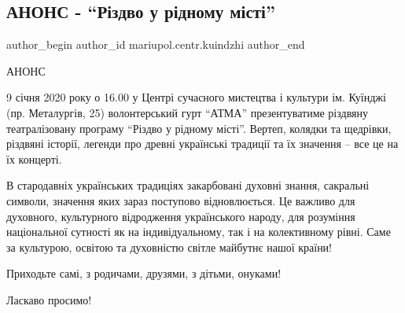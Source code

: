  
 
 
 
 

\subsection{АНОНС - \enquote{Різдво у рідному місті}}
\label{sec:27_12_2019.fb.mariupol.centr.kuindzhi.1.anons_rizdvo_u_ridnomu_misti}

\ifcmt
 author_begin
   author_id mariupol.centr.kuindzhi
 author_end
\fi

АНОНС

9 січня 2020 року о 16.00 у Центрі сучасного мистецтва і культури ім. Куїнджі
(пр. Металургів, 25)  волонтерський гурт \enquote{АТМА} презентуватиме різдвяну
театралізовану програму \enquote{Різдво у рідному місті}. Вертеп, колядки та
щедрівки, різдвяні історії, легенди про древні українські традиції та їх
значення – все це на їх концерті.

В стародавніх українських традиціях закарбовані духовні знання, сакральні
символи, значення яких зараз поступово відновлюється. Це важливо для духовного,
культурного відродження українського народу, для розуміння національної
сутності як на індивідуальному, так і на колективному рівні. Саме за культурою,
освітою та духовністю світле майбутнє нашої країни!

Приходьте самі, з родичами, друзями, з дітьми, онуками!

Ласкаво просимо!
